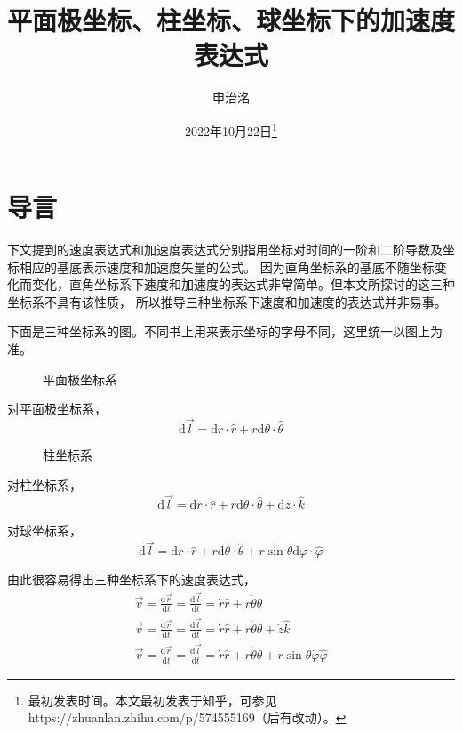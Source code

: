 \documentclass{ctexart}
\title{平面极坐标、柱坐标、球坐标下的加速度表达式}
\author{申治洺}
\date{2022年10月22日\footnote{最初发表时间。本文最初发表于知乎，可参见https://zhuanlan.zhihu.com/p/574555169（后有改动）。}}
\begin{document}
    \maketitle  %
    
    \section{导言}\label{sec:1}

    下文提到的速度表达式和加速度表达式分别指用坐标对时间的一阶和二阶导数及坐标相应的基底表示速度和加速度矢量的公式。
    因为直角坐标系的基底不随坐标变化而变化，直角坐标系下速度和加速度的表达式非常简单。但本文所探讨的这三种坐标系不具有该性质，
    所以推导三种坐标系下速度和加速度的表达式并非易事。

    下面是三种坐标系的图。不同书上用来表示坐标的字母不同，这里统一以图上为准。

    \begin{figure}[ht]
    \centering
    
    \caption{平面极坐标系}
    \label{fig:polar}
    \end{figure}

    对平面极坐标系，
    \begin{equation*}
        \mathrm{d}\vec{l} = \mathrm{d}r\cdot\hat{r} + r\mathrm{d}\theta\cdot\hat{\theta}
    \end{equation*}

    \begin{figure}[ht]
        \centering
        
        \caption{柱坐标系}
        \label{fig:cylindrical}
    \end{figure}
    
    对柱坐标系，
    \begin{equation*}
        \mathrm{d}\vec{l} = \mathrm{d}r\cdot\hat{r} + r\mathrm{d}\theta\cdot\hat{\theta} +
        \mathrm{d}z\cdot\hat{k}
    \end{equation*}
    
    对球坐标系，
    \begin{equation*}
        \mathrm{d}\vec{l} = \mathrm{d}r\cdot\hat{r} + r\mathrm{d}\theta\cdot\hat{\theta} +
        r\sin\theta\mathrm{d}\varphi\cdot\hat{\varphi}
    \end{equation*}

    由此很容易得出三种坐标系下的速度表达式，
    \begin{gather*}
        \vec{v} = \frac{\mathrm{d}\vec{r}}{\mathrm{d}t} = \frac{\mathrm{d}\vec{l}}{\mathrm{d}t} =
        \dot{r}\hat{r} + r\dot{\theta}\hat{\theta} \\
        \vec{v} = \frac{\mathrm{d}\vec{r}}{\mathrm{d}t} = \frac{\mathrm{d}\vec{l}}{\mathrm{d}t} =
        \dot{r}\hat{r} + r\dot{\theta}\hat{\theta} + \dot{z}\hat{k} \\
        \vec{v} = \frac{\mathrm{d}\vec{r}}{\mathrm{d}t} = \frac{\mathrm{d}\vec{l}}{\mathrm{d}t} =
        \dot{r}\hat{r} + r\dot{\theta}\hat{\theta} + r\sin\theta\dot{\varphi}\hat{\varphi}
    \end{gather*}
\end{document}
